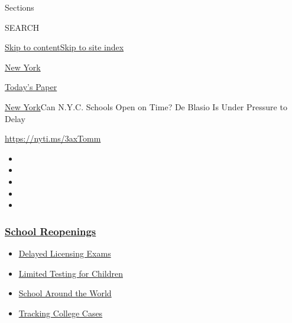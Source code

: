 Sections

SEARCH

\protect\hyperlink{site-content}{Skip to
content}\protect\hyperlink{site-index}{Skip to site index}

\href{https://www.nytimes3xbfgragh.onion/section/nyregion}{New York}

\href{https://myaccount.nytimes3xbfgragh.onion/auth/login?response_type=cookie\&client_id=vi}{}

\href{https://www.nytimes3xbfgragh.onion/section/todayspaper}{Today's
Paper}

\href{/section/nyregion}{New York}\textbar{}Can N.Y.C. Schools Open on
Time? De Blasio Is Under Pressure to Delay

\url{https://nyti.ms/3axTomm}

\begin{itemize}
\item
\item
\item
\item
\item
\end{itemize}

\hypertarget{school-reopenings}{%
\subsubsection{\texorpdfstring{\href{https://www.nytimes3xbfgragh.onion/spotlight/schools-reopening?name=styln-coronavirus-schools-reopening\&region=TOP_BANNER\&block=storyline_menu_recirc\&action=click\&pgtype=Article\&impression_id=f9f414c0-f280-11ea-8e1e-df7c7f9e9d81\&variant=undefined}{School
Reopenings}}{School Reopenings}}\label{school-reopenings}}

\begin{itemize}
\tightlist
\item
  \href{https://www.nytimes3xbfgragh.onion/2020/09/04/us/bar-exam-coronavirus.html?name=styln-coronavirus-schools-reopening\&region=TOP_BANNER\&block=storyline_menu_recirc\&action=click\&pgtype=Article\&impression_id=f9f414c1-f280-11ea-8e1e-df7c7f9e9d81\&variant=undefined}{Delayed
  Licensing Exams}
\item
  \href{https://www.nytimes3xbfgragh.onion/2020/09/08/upshot/children-testing-shortfalls-virus.html?name=styln-coronavirus-schools-reopening\&region=TOP_BANNER\&block=storyline_menu_recirc\&action=click\&pgtype=Article\&impression_id=f9f414c2-f280-11ea-8e1e-df7c7f9e9d81\&variant=undefined}{Limited
  Testing for Children}
\item
  \href{https://www.nytimes3xbfgragh.onion/2020/09/01/world/schools-reopen-globe-students.html?name=styln-coronavirus-schools-reopening\&region=TOP_BANNER\&block=storyline_menu_recirc\&action=click\&pgtype=Article\&impression_id=f9f414c3-f280-11ea-8e1e-df7c7f9e9d81\&variant=undefined}{School
  Around the World}
\item
  \href{https://www.nytimes3xbfgragh.onion/interactive/2020/us/covid-college-cases-tracker.html?name=styln-coronavirus-schools-reopening\&region=TOP_BANNER\&block=storyline_menu_recirc\&action=click\&pgtype=Article\&impression_id=f9f43bd0-f280-11ea-8e1e-df7c7f9e9d81\&variant=undefined}{Tracking
  College Cases}
\end{itemize}

